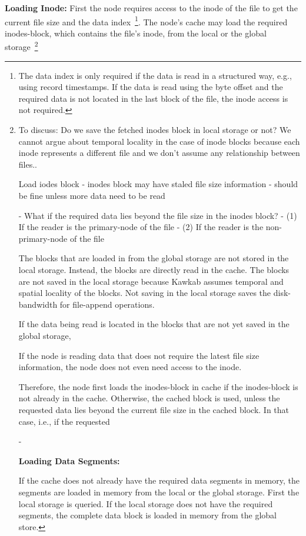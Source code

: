 \documentclass[]{article}
\newcommand{\subtopic}[1]{\vspace{1.5pt} \noindent \textbf{#1}}
\newcommand{\hl}[1]{\textcolor{notecolor}{#1}}
\begin{document}
\subtopic{Loading Inode:} First the node requires access to the inode of the
file to get the current file size and the data index~\footnote{The data index
is only required if the data is read in a structured way, e.g., using record
timestamps. If the data is read using the byte offset and the required data is
not located in the last block of the file, the inode access is not required.}.
The node's cache may load the required inodes-block, which contains the file's
inode, from the local or the global storage~\footnote{\hl{To discuss: Do we
save the fetched inodes block in local storage or not? We cannot argue 
about temporal locality in the case of inode blocks because each inode
represents a different file and we don't assume any relationship between
files.}.

 Load iodes block
  - inodes block may have staled file size information
    - should be fine unless more data need to be read

- What if the required data lies beyond the file size in the inodes block?
  - (1) If the reader is the primary-node of the file
  - (2) If the reader is the non-primary-node of the file


The blocks that are loaded in from the global storage are not stored in the
local storage. Instead, the blocks are directly read in the cache. The blocks
are not saved in the local storage because Kawkab assumes temporal and spatial
locality of the blocks. Not saving in the local storage saves the
disk-bandwidth for file-append operations.


If the data being read is located in the blocks that are not yet
saved in the global storage, 

If the node is reading data that does
not require the latest file size information, the node does not even
need access to the inode.


Therefore, the node first loads the
inodes-block in cache if the inodes-block is not already in the cache.
Otherwise, the cached block is used, unless the requested data lies beyond the
current file size in the cached block. In that case, i.e., if the requested

-


\subtopic{Loading Data Segments:}

If the cache does not already have the required data segments in memory,
the segments are loaded in memory from the local or the global storage.  First
the local storage is queried. If the local storage does not have the required
segments, the complete data block is loaded in memory from the global store.

}
\end{document}
